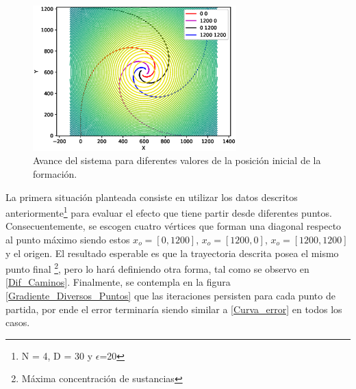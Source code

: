 \begin{figure}[H]
\centering
\includegraphics[width=0.70\textwidth]{figures/4_puntos_observar_forma/Figure_1.eps}
\caption{Avance del sistema para diferentes valores de la posición inicial de la formación.} \label{Avance_Posicion}
\end{figure}

La primera situación planteada consiste en utilizar los datos descritos anteriormente\footnote[9]{ N = 4, D = 30 y $\epsilon$=20} para evaluar el efecto que tiene partir desde diferentes puntos. Consecuentemente, se escogen cuatro vértices que forman una diagonal respecto al punto máximo siendo estos $x_o=[0,1200]$, $x_o=[1200,0]$, $x_o=[1200,1200]$ y el origen. El resultado esperable es que la trayectoria descrita posea el mismo punto final \footnote[10]{Máxima concentración de sustancias}, pero lo hará definiendo otra forma, tal como se observo en \ref{Dif_Caminos}. Finalmente, se contempla en la figura \ref{Gradiente_Diversos_Puntos} que las iteraciones persisten para cada punto de partida, por ende el error terminaría siendo similar a \ref{Curva_error} en todos los casos. 

